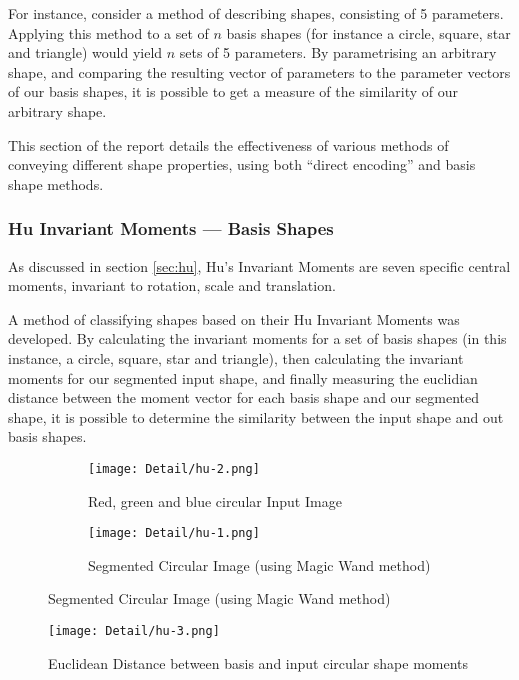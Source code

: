 For instance, consider a method of describing shapes, consisting of 5 parameters. Applying this method to a set of $n$ basis shapes (for instance a circle, square, star and triangle) would yield $n$ sets of 5 parameters. By parametrising an arbitrary shape, and comparing the resulting vector of parameters to the parameter vectors of our basis shapes, it is possible to get a measure of the similarity of our arbitrary shape.

This section of the report details the effectiveness of various methods of conveying different shape properties, using both ``direct encoding'' and basis shape methods.

\subsubsection{Hu Invariant Moments --- Basis Shapes}
\label{sec:hubs}
As discussed in section \ref{sec:hu}, Hu's Invariant Moments are seven specific central moments, invariant to rotation, scale and translation.

A method of classifying shapes based on their Hu Invariant Moments was developed. By calculating the invariant moments for a set of basis shapes (in this instance, a circle, square, star and triangle), then calculating the invariant moments for our segmented input shape, and finally measuring the euclidian distance between the moment vector for each basis shape and our segmented shape, it is possible to determine the similarity between the input shape and out basis shapes.



\begin{figure}[H]
    \centering
    \begin{subfigure}[h]{0.4\textwidth}
        \centering
        \texttt{[image: Detail/hu-2.png]}
        \caption{Red, green and blue circular Input Image}
    \end{subfigure}
    \begin{subfigure}[h]{0.4\textwidth}
        \centering
        \texttt{[image: Detail/hu-1.png]}
        \caption{Segmented Circular Image (using Magic Wand method)}
    \end{subfigure}
\end{figure}

\begin{figure}[H]
    \centering
    \texttt{[image: Detail/hu-3.png]}
    \caption{Euclidean Distance between basis and input circular shape moments}
\end{figure}

